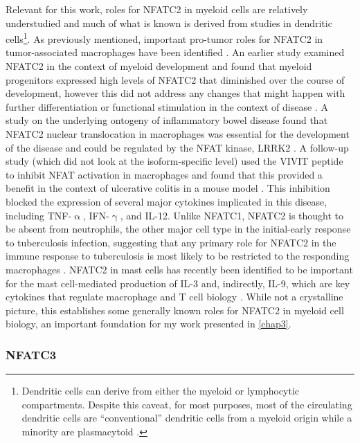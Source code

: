 Relevant for this work, roles for NFATC2 in myeloid cells are relatively understudied and much of what is known is derived from studies in dendritic cells\footnote{Dendritic cells can derive from either the myeloid or lymphocytic compartments. Despite this caveat, for most purposes, most of the circulating dendritic cells are ``conventional'' dendritic cells from a myeloid origin while a minority are plasmacytoid \citep{Shortman2002, Collin2018}.}. As previously mentioned, important pro\hyp{}tumor roles for NFATC2 in tumor\hyp{}associated macrophages have been identified \citep{Liu2018}. An earlier study examined NFATC2 in the context of myeloid development and found that myeloid progenitors expressed high levels of NFATC2 that diminished over the course of development, however this did not address any changes that might happen with further differentiation or functional stimulation in the context of disease \citep{Kiani2004}. A study on the underlying ontogeny of inflammatory bowel disease found that NFATC2 nuclear translocation in macrophages was essential for the development of the disease and could be regulated by the NFAT kinase, LRRK2 \citep{Liu2011}. A follow\hyp{}up study (which did not look at the isoform\hyp{}specific level) used the VIVIT peptide to inhibit NFAT activation in macrophages and found that this provided a benefit in the context of ulcerative colitis in a mouse model \citep{Elloumi2012}. This inhibition blocked the expression of several major cytokines implicated in this disease, including TNF\hyp{}$\upalpha$, IFN\hyp{}$\upgamma$, and IL\hyp{}12. Unlike NFATC1, NFATC2 is thought to be absent from neutrophils, the other major cell type in the initial\hyp{}early response to tuberculosis infection, suggesting that any primary role for NFATC2 in the immune response to tuberculosis is most likely to be restricted to the responding macrophages \citep{Greenblatt2010}. NFATC2 in mast cells has recently been identified to be important for the mast cell\hyp{}mediated production of IL\hyp{}3 and, indirectly, IL\hyp{}9, which are key cytokines that regulate macrophage and T cell biology \citep{Sabbaghi2021}. While not a crystalline picture, this establishes some generally known roles for NFATC2 in myeloid cell biology, an important foundation for my work presented in \autoref{chap3}.

\subsubsection{NFATC3}\label{nfatc3}

